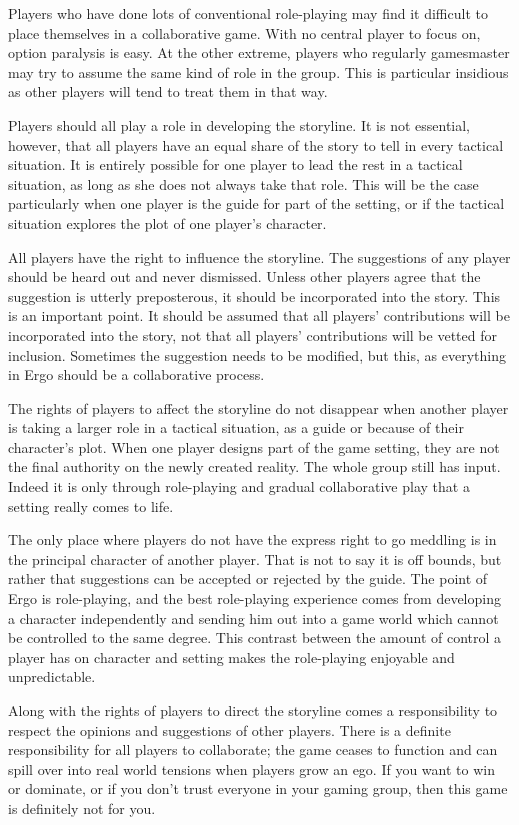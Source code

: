\documentclass[twoside]{book}
\begin{document}
Players who have done lots of conventional role-playing may find it
difficult to place themselves in a collaborative game. With no central
player to focus on, option paralysis is easy. At the other extreme,
players who regularly gamesmaster may try to assume the same kind of
role in the group. This is particular insidious as other players will
tend to treat them in that way.

Players should all play a role in developing the storyline. It is not
essential, however, that all players have an equal share of the story
to tell in every tactical situation. It is entirely possible for one
player to lead the rest in a tactical situation, as long as she does
not always take that role. This will be the case particularly when one
player is the guide for part of the setting, or if the tactical
situation explores the plot of one player's character.

All players have the right to influence the storyline. The suggestions
of any player should be heard out and never dismissed. Unless other
players agree that the suggestion is utterly preposterous, it should
be incorporated into the story. This is an important point. It should
be assumed that all players' contributions will be incorporated into
the story, not that all players' contributions will be vetted for
inclusion. Sometimes the suggestion needs to be modified, but this, as
everything in Ergo should be a collaborative process.

The rights of players to affect the storyline do not disappear when
another player is taking a larger role in a tactical situation, as a
guide or because of their character's plot. When one player designs
part of the game setting, they are not the final authority on the
newly created reality. The whole group still has input. Indeed it is
only through role-playing and gradual collaborative play that a
setting really comes to life.

The only place where players do not have the express right to go
meddling is in the principal character of another player. That is not
to say it is off bounds, but rather that suggestions can be accepted
or rejected by the guide. The point of Ergo is role-playing, and the
best role-playing experience comes from developing a character
independently and sending him out into a game world which cannot be
controlled to the same degree. This contrast between the amount of
control a player has on character and setting makes the role-playing
enjoyable and unpredictable.

Along with the rights of players to direct the storyline comes a
responsibility to respect the opinions and suggestions of other
players. There is a definite responsibility for all players to
collaborate; the game ceases to function and can spill over into real
world tensions when players grow an ego. If you want to win or
dominate, or if you don't trust everyone in your gaming group, then
this game is definitely not for you.
\end{document}
